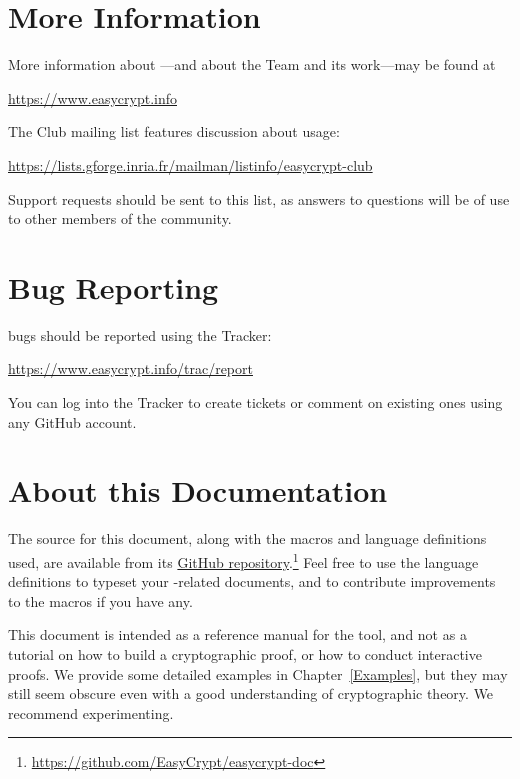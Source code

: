 \section{More Information}

More information about \EasyCrypt---and about the \EasyCrypt Team and
its work---may be found at
\begin{center}
  \url{https://www.easycrypt.info}
\end{center}
The \EasyCrypt Club mailing list features discussion about
\EasyCrypt usage:
\begin{center}
  \url{https://lists.gforge.inria.fr/mailman/listinfo/easycrypt-club}
\end{center}
Support requests should be sent to this list, as answers to questions
will be of use to other members of the \EasyCrypt community.

\section{Bug Reporting}

\EasyCrypt bugs should be reported using the Tracker:
\begin{center}
  \url{https://www.easycrypt.info/trac/report}
\end{center}
You can log into the Tracker to create tickets or comment on existing
ones using any GitHub account.

\section{About this Documentation}

The source for this document, along with the macros and language
definitions used, are available from its
\href{https://github.com/EasyCrypt/easycrypt-doc}{GitHub
  repository}.\footnote{\url{https://github.com/EasyCrypt/easycrypt-doc}}
Feel free to use the language definitions to typeset your
\EasyCrypt-related documents, and to contribute improvements to the
macros if you have any.

This document is intended as a reference manual for the \EasyCrypt
tool, and not as a tutorial on how to build a cryptographic proof, or
how to conduct interactive proofs. We provide some detailed examples
in Chapter~\ref{Examples}, but they may still seem obscure even with a
good understanding of cryptographic theory. We recommend
experimenting.

